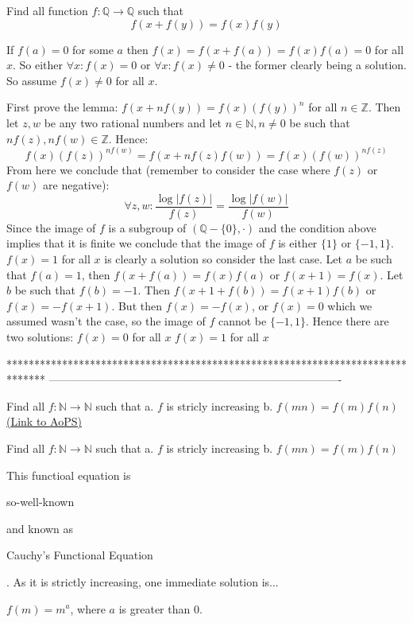 \begin{solution}
	\begin{tcolorbox}Find all function $f: \mathbb{Q} \to \mathbb{Q}$ such that
\[f(x+f(y))=f(x)f(y)\]\end{tcolorbox}
If $f(a) = 0$ for some $a$ then $f(x)=f(x+f(a))=f(x)f(a)=0$ for all $x$. So either $\forall x: f(x) = 0$ or $\forall x: f(x) \neq 0$ - the former clearly being a solution. So assume $f(x) \neq 0$ for all $x$.

First prove the lemma: $f(x+nf(y)) = f(x)(f(y))^n$ for all $n \in \mathbb{Z}$. Then let $z,w$ be any two rational numbers and let $n \in \mathbb{N}, n \neq 0$ be such that $nf(z), nf(w) \in \mathbb{Z}$. Hence:
\[ f(x)(f(z))^{nf(w)} = f(x+nf(z)f(w)) = f(x)(f(w))^{nf(z)} \]
From here we conclude that (remember to consider the case where $f(z)$ or $f(w)$ are negative):
\[ \forall z,w: \frac{\log |f(z)|}{f(z)} = \frac{\log |f(w)|}{f(w)} \]
Since the image of $f$ is a subgroup of $(\mathbb{Q}-\{0\}, \cdot)$ and the condition above implies that it is finite we conclude that the image of $f$ is either $\{1\}$ or $\{-1,1\}$. $f(x) = 1$ for all $x$ is clearly a solution so consider the last case. Let $a$ be such that $f(a) = 1$, then $f(x+f(a)) = f(x)f(a)$ or $f(x+1) = f(x)$. Let $b$ be such that $f(b) = -1$. Then $f(x+1+f(b)) = f(x+1)f(b)$ or $f(x) = -f(x+1)$. But then $f(x) = -f(x)$, or $f(x) = 0$ which we assumed wasn't the case, so the image of $f$ cannot be $\{-1,1\}$. Hence there are two solutions:
$f(x) = 0$ for all $x$
$f(x) = 1$ for all $x$
\end{solution}
*******************************************************************************
-------------------------------------------------------------------------------

\begin{problem}
	Find all $f: \mathbb{N} \to \mathbb{N}$ such that
a. $f$ is stricly increasing
b.  $f(mn)=f(m)f(n)$
	\flushright \href{https://artofproblemsolving.com/community/c6h488133}{(Link to AoPS)}
\end{problem}



\begin{solution}
	\begin{tcolorbox}Find all $f: \mathbb{N} \to \mathbb{N}$ such that
a. $f$ is stricly increasing
b.  $f(mn)=f(m)f(n)$\end{tcolorbox}

This functioal equation is \begin{bolded}so-well-known\end{bolded} and known as \begin{bolded}Cauchy's Functional Equation\end{bolded}.
As it is strictly increasing, one immediate solution is...

$f(m)=m^a$, where $a$ is greater than $0$.
\end{solution}



